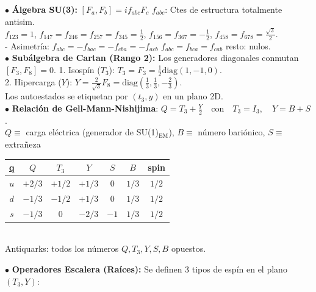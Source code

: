 $\bullet$ \textbf{Álgebra SU(3):} $ [F_a, F_b] = i f_{abc} F_c$ \quad $f_{abc}$: Ctes de estructura totalmente antisim.\\
$f_{123}=1$, $f_{147} = f_{246} = f_{257} = f_{345} = \frac{1}{2}$, $f_{156} = f_{367} = -\frac{1}{2}$, $f_{458} = f_{678} = \frac{\sqrt{3}}{2}$.\\
- Asimetría: $f_{abc} = -f_{bac} = -f_{cba} = -f_{acb}$\;\;\; $f_{abc} = f_{bca} = f_{cab}$ \;\;\; resto: nulos.\\

$\bullet$ \textbf{Subálgebra de Cartan (Rango 2):}
Los generadores diagonales conmutan $[F_3, F_8]=0$.
1. Isospín ($T_3$): $T_3=F_3 = \frac{1}{2}\text{diag}(1, -1, 0)$.\\
2. Hipercarga ($Y$): $Y = \frac{2}{\sqrt{3}}F_8 = \text{diag}(\frac{1}{3}, \frac{1}{3}, -\frac{2}{3})$.\\
Los autoestados se etiquetan por $(t_3, y)$ en un plano 2D.\\
$\bullet$ \textbf{Relación de Gell-Mann-Nishijima}:
$ Q = T_3 + \frac{Y}{2} \quad \text{con} \quad T_3 = I_3, \quad Y = B + S $.\\
$Q\equiv$ carga eléctrica (generador de SU(1)$_{\text{EM}}$), $B\equiv$ número bariónico, $S\equiv$ extrañeza
\begin{center}
\begin{tabular}{|c|c|c|c|c|c|c|}
\hline
\hyperlink{quarks_table}{\textbf{q}} & \textbf{$Q$} & \textbf{$T_3$} & \textbf{$Y$} & \textbf{$S$} & \textbf{$B$} & \textbf{spin}\\ \hline
$u$ & $+2/3$ & $+1/2$ & $+1/3$ & $0$ & $1/3$ & $1/2$ \\ \hline
$d$ & $-1/3$ & $-1/2$ & $+1/3$ & $0$ & $1/3$&$1/2$\\ \hline
$s$ & $-1/3$ & $0$ & $-2/3$ & $-1$ & $1/3$ & $1/2$\\ \hline
\end{tabular}\\[2pt]
Antiquarks: todos los números $Q,T_3, Y, S,B$ opuestos.
\end{center}
$\bullet$ \textbf{Operadores Escalera (Raíces):}
Se definen 3 tipos de espín en el plano $(T_3, Y)$:\\

